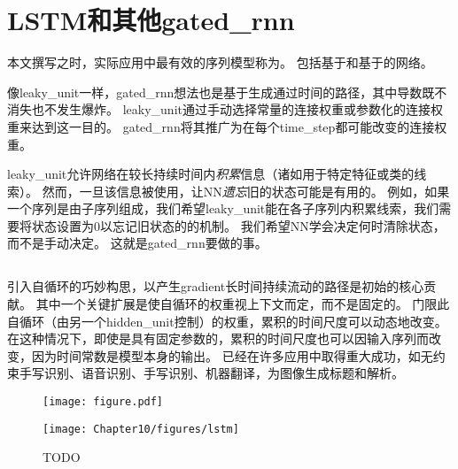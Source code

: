 \section{\gls{LSTM}和其他\gls{gated_rnn}}
\label{sec:the_long_short_term_memory_and_other_gated_rnns}
本文撰写之时，实际应用中最有效的序列模型称为。
包括基于和基于的网络。

像\gls{leaky_unit}一样，\gls{gated_rnn}想法也是基于生成通过时间的路径，其中导数既不消失也不发生爆炸。
\gls{leaky_unit}通过手动选择常量的连接权重或参数化的连接权重来达到这一目的。
\gls{gated_rnn}将其推广为在每个\gls{time_step}都可能改变的连接权重。

\gls{leaky_unit}允许网络在较长持续时间内\emph{积累}信息（诸如用于特定特征或类的线索）。
然而，一旦该信息被使用，让\gls{NN}\emph{遗忘}旧的状态可能是有用的。
例如，如果一个序列是由子序列组成，我们希望\gls{leaky_unit}能在各子序列内积累线索，我们需要将状态设置为0以忘记旧状态的的机制。
我们希望\gls{NN}学会决定何时清除状态，而不是手动决定。
这就是\gls{gated_rnn}要做的事。

\subsection{}
\label{sec:lstm}
引入自循环的巧妙构思，以产生\gls{gradient}长时间持续流动的路径是初始的核心贡献\citep{Hochreiter+Schmidhuber-1997}。
其中一个关键扩展是使自循环的权重视上下文而定，而不是固定的\citep{Gers-et-al-2000}。
门限此自循环（由另一个\gls{hidden_unit}控制）的权重，累积的时间尺度可以动态地改变。
在这种情况下，即使是具有固定参数的，累积的时间尺度也可以因输入序列而改变，因为时间常数是模型本身的输出。
已经在许多应用中取得重大成功，如无约束手写识别\citep{Graves+Schmidhuber-2009}、语音识别\citep{Graves-et-al-ICASSP2013,Graves+Jaitly-ICML2014}、手写识别\citep{Graves-et-al-ICASSP2013}、机器翻译\citep{Sutskever-et-al-NIPS2014}，为图像生成标题\citep{Kiros-et-al-arxiv2014,Vinyals-et-al-arxiv2014,Xu-et-al-ICML2015}和解析\citep{Vinyals2014}。


\begin{figure}[!htb]
\ifOpenSource
\centerline{\texttt{[image: figure.pdf]}}
\else
\centerline{\texttt{[image: Chapter10/figures/lstm]}}
\fi
\caption{TODO}
\label{fig:chap10_lstm}
\end{figure}

